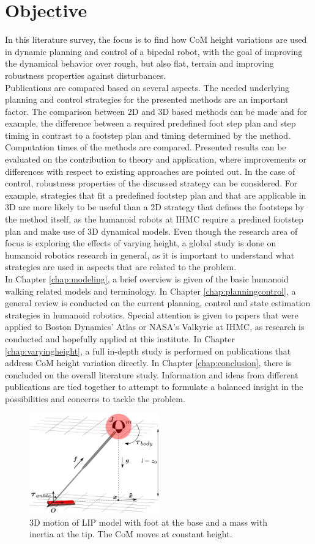 \section{Objective}
In this literature survey, the focus is to find how \ac{CoM} height variations are used in dynamic planning and control of a bipedal robot, with the goal of improving the dynamical behavior over rough, but also flat, terrain and improving robustness properties against disturbances. \\
Publications are compared based on several aspects. The needed underlying planning and control strategies for the presented methods are an important factor. The comparison between \ac{2D} and \ac{3D} based methods can be made and for example, the difference between a required predefined foot step plan and step timing in contrast to a footstep plan and timing determined by the method. Computation times of the methods are compared. Presented results can be evaluated on the contribution to theory and application, where improvements or differences with respect to existing approaches are pointed out. In the case of control, robustness properties of the discussed strategy can be considered. For example, strategies that fit a predefined footstep plan and that are applicable in \ac{3D} are more likely to be useful than a \ac{2D} strategy that defines the footsteps by the method itself, as the humanoid robots at IHMC require a predined footstep plan and make use of \ac{3D} dynamical models. Even though the research area of focus is exploring the effects of varying height, a global study is done on humanoid robotics research in general, as it is important to understand what strategies are used in aspects that are related to the problem. \\
In Chapter \ref{chap:modeling}, a brief overview is given of the basic humanoid walking related models and terminology. In Chapter \ref{chap:planningcontrol}, a general review is conducted on the current planning, control and state estimation strategies in humanoid robotics. Special attention is given to papers that were applied to Boston Dynamics' Atlas or NASA's Valkyrie at IHMC, as research is conducted and hopefully applied at this institute. In Chapter \ref{chap:varyingheight}, a full in-depth study is performed on publications that address \ac{CoM} height variation directly. In Chapter \ref{chap:conclusion}, there is concluded on the overall literature study. Information and ideas from different publications are tied together to attempt to formulate a balanced insight in the possibilities and concerns to tackle the problem.
\begin{figure}[h]
\centering
\includegraphics[width=0.5\textwidth]{STYLESTUFF/3DCoMfootinertiaz0.png}
\caption{\ac{3D} motion of \ac{LIP} model with foot at the base and a mass with inertia at the tip. The \ac{CoM} moves at constant height.}
\label{fig:3dlipfootinertiaz0}
\end{figure}




